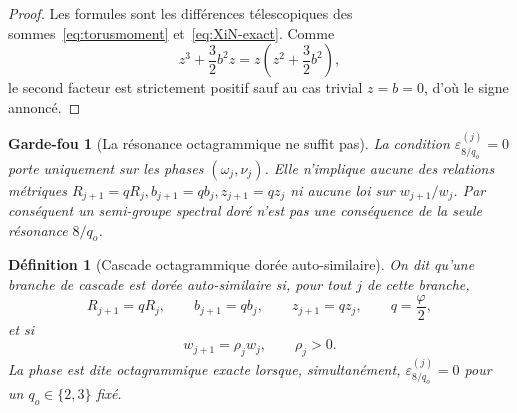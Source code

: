 \documentclass[11pt,a4paper]{article}
\newtheorem{definition}[theorem]{Définition}
\newtheorem{guardrail}[theorem]{Garde-fou}
\newcommand{\ph}{\varphi}
\newcommand{\eps}{\varepsilon}
\begin{document}
\begin{proof}
Les formules sont les différences télescopiques des sommes~\eqref{eq:torusmoment} et~\eqref{eq:XiN-exact}. Comme
\[
 z^3+\frac32b^2z=z\left(z^2+\frac32b^2\right),
\]
le second facteur est strictement positif sauf au cas trivial $z=b=0$, d'où le signe annoncé.
\end{proof}

\begin{guardrail}[La résonance octagrammique ne suffit pas]
La condition $\eps_{8/q_o}^{(j)}=0$ porte uniquement sur les phases $(\omega_j,\nu_j)$. Elle n'implique aucune des relations métriques
\(
R_{j+1}=qR_j,
 b_{j+1}=qb_j,
 z_{j+1}=qz_j
\)
ni aucune loi sur $w_{j+1}/w_j$. Par conséquent un semi-groupe spectral doré n'est pas une conséquence de la seule résonance $8/q_o$.
\end{guardrail}

\begin{definition}[Cascade octagrammique dorée auto-similaire]\label{def:golden-octagram-selfsimilar}
On dit qu'une branche de cascade est \emph{dorée auto-similaire} si, pour tout $j$ de cette branche,
\begin{equation}\label{eq:selfsimilar-q-law}
 R_{j+1}=qR_j,
 \qquad b_{j+1}=qb_j,
 \qquad z_{j+1}=qz_j,
 \qquad q=\frac\ph2,
\end{equation}
et si
\begin{equation}\label{eq:weight-ratio-rho}
 w_{j+1}=\rho_jw_j,
 \qquad \rho_j>0.
\end{equation}
La phase est dite octagrammique exacte lorsque, simultanément, $\eps_{8/q_o}^{(j)}=0$ pour un $q_o\in\{2,3\}$ fixé.
\end{definition}
\end{document}
